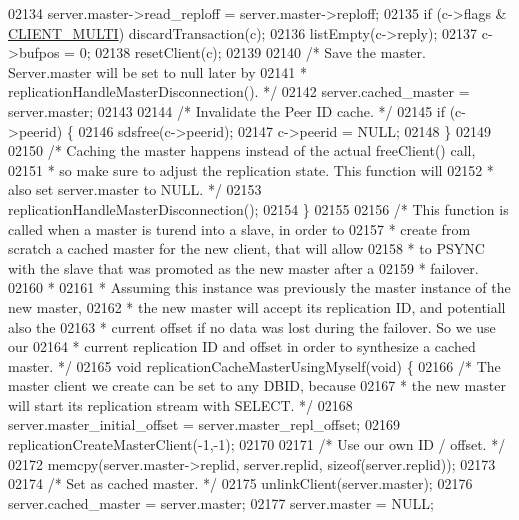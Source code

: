 \begin{DoxyCode}
{{{{{{{{{{{{{{{{{{{{{{{{{{{{{{{{{{{{{{{{{{{{{{{{{{{{{{{{{{{{{{{{{{{{{{{{{02134     server.master->read\_reploff = server.master->reploff;
02135     \textcolor{keywordflow}{if} (c->flags & \hyperlink{server_8h_a7f61f783f429419f8c593291a509b03a}{CLIENT\_MULTI}) discardTransaction(c);
02136     listEmpty(c->reply);
02137     c->bufpos = 0;
02138     resetClient(c);
02139 
02140     \textcolor{comment}{/* Save the master. Server.master will be set to null later by}
02141 \textcolor{comment}{     * replicationHandleMasterDisconnection(). */}
02142     server.cached\_master = server.master;
02143 
02144     \textcolor{comment}{/* Invalidate the Peer ID cache. */}
02145     \textcolor{keywordflow}{if} (c->peerid) \{
02146         sdsfree(c->peerid);
02147         c->peerid = NULL;
02148     \}
02149 
02150     \textcolor{comment}{/* Caching the master happens instead of the actual freeClient() call,}
02151 \textcolor{comment}{     * so make sure to adjust the replication state. This function will}
02152 \textcolor{comment}{     * also set server.master to NULL. */}
02153     replicationHandleMasterDisconnection();
02154 \}
02155 
02156 \textcolor{comment}{/* This function is called when a master is turend into a slave, in order to}
02157 \textcolor{comment}{ * create from scratch a cached master for the new client, that will allow}
02158 \textcolor{comment}{ * to PSYNC with the slave that was promoted as the new master after a}
02159 \textcolor{comment}{ * failover.}
02160 \textcolor{comment}{ *}
02161 \textcolor{comment}{ * Assuming this instance was previously the master instance of the new master,}
02162 \textcolor{comment}{ * the new master will accept its replication ID, and potentiall also the}
02163 \textcolor{comment}{ * current offset if no data was lost during the failover. So we use our}
02164 \textcolor{comment}{ * current replication ID and offset in order to synthesize a cached master. */}
02165 \textcolor{keywordtype}{void} replicationCacheMasterUsingMyself(\textcolor{keywordtype}{void}) \{
02166     \textcolor{comment}{/* The master client we create can be set to any DBID, because}
02167 \textcolor{comment}{     * the new master will start its replication stream with SELECT. */}
02168     server.master\_initial\_offset = server.master\_repl\_offset;
02169     replicationCreateMasterClient(-1,-1);
02170 
02171     \textcolor{comment}{/* Use our own ID / offset. */}
02172     memcpy(server.master->replid, server.replid, \textcolor{keyword}{sizeof}(server.replid));
02173 
02174     \textcolor{comment}{/* Set as cached master. */}
02175     unlinkClient(server.master);
02176     server.cached\_master = server.master;
02177     server.master = NULL;
}}}}}}}}}}}}}}}}}}}}}}}}}}}}}}}}}}}}}}}}}}}}}}}}}}}}}}}}}}}}}}}}}}}}}}}}}
\end{DoxyCode}
